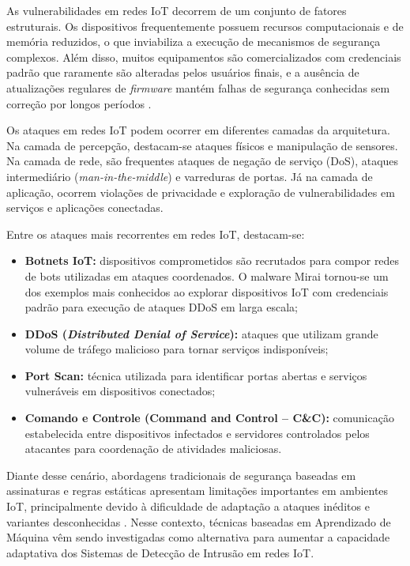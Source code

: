 As vulnerabilidades em redes IoT decorrem de um conjunto de fatores estruturais. Os dispositivos frequentemente possuem recursos computacionais e de memória reduzidos, o que inviabiliza a execução de mecanismos de segurança complexos. Além disso, muitos equipamentos são comercializados com credenciais padrão que raramente são alteradas pelos usuários finais, e a ausência de atualizações regulares de \textit{firmware} mantém falhas de segurança conhecidas sem correção por longos períodos \citep{Alfahaid2025}.

Os ataques em redes IoT podem ocorrer em diferentes camadas da arquitetura. Na camada de percepção, destacam-se ataques físicos e manipulação de sensores. Na camada de rede, são frequentes ataques de negação de serviço (DoS), ataques intermediário (\textit{man-in-the-middle}) e varreduras de portas. Já na camada de aplicação, ocorrem violações de privacidade e exploração de vulnerabilidades em serviços e aplicações conectadas.

Entre os ataques mais recorrentes em redes IoT, destacam-se:

\begin{itemize}[leftmargin=5em]

    \item \textbf{Botnets IoT:} dispositivos comprometidos são recrutados para compor redes de bots utilizadas em ataques coordenados. O malware Mirai tornou-se um dos exemplos mais conhecidos ao explorar dispositivos IoT com credenciais padrão para execução de ataques DDoS em larga escala;

    \item \textbf{DDoS (\textit{Distributed Denial of Service}):} ataques que utilizam grande volume de tráfego malicioso para tornar serviços indisponíveis;

    \item \textbf{Port Scan:} técnica utilizada para identificar portas abertas e serviços vulneráveis em dispositivos conectados;

    \item \textbf{Comando e Controle (Command and Control -- C\&C):} comunicação estabelecida entre dispositivos infectados e servidores controlados pelos atacantes para coordenação de atividades maliciosas.

\end{itemize}

Diante desse cenário, abordagens tradicionais de segurança baseadas em assinaturas e regras estáticas apresentam limitações importantes em ambientes IoT, principalmente devido à dificuldade de adaptação a ataques inéditos e variantes desconhecidas \citep{Rahman2025}. Nesse contexto, técnicas baseadas em Aprendizado de Máquina vêm sendo investigadas como alternativa para aumentar a capacidade adaptativa dos Sistemas de Detecção de Intrusão em redes IoT.

